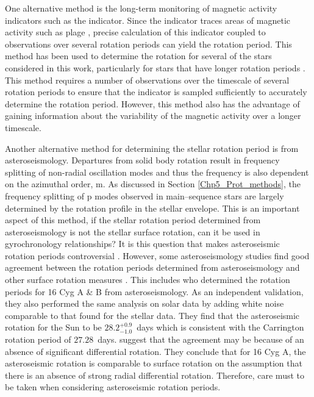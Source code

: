 One alternative method is the long-term monitoring of magnetic activity indicators such as the \Rprime indicator. Since the \Rprime indicator traces areas of magnetic activity such as plage \citep{Leighton_1959}, precise calculation of this indicator coupled to observations over several rotation periods can yield the rotation period. This method has been used to determine the rotation for several of the stars considered in this work, particularly for stars that have longer rotation periods \citep{Boro_Saikia_etal_2016,Vaughan_etal_1981,Robertson_etal_2015_GJ191}. This method requires a number of observations over the timescale of several rotation periods to ensure that the \Rprime indicator is sampled sufficiently to accurately determine the rotation period. However, this method also has the advantage of gaining information about the variability of the magnetic activity over a longer timescale.

Another alternative method for determining the stellar rotation period is from asteroseismology. Departures from solid body rotation result in frequency splitting of non-radial oscillation modes and thus the frequency is also dependent on the azimuthal order, m. As discussed in Section \ref{Chp5_Prot_methods}, the frequency splitting of p modes observed in main--sequence stars are largely determined by the rotation profile in the stellar envelope. This is an important aspect of this method, if the stellar rotation period determined from asteroseismology is not the stellar surface rotation, can it be used in gyrochronology relationships? It is this question that makes asteroseismic rotation periods controversial \citep{Barnes_etal_2016_aspect_gyro}. However, some asteroseismology studies find good agreement between the rotation periods determined from asteroseismology and other surface rotation measures \citep{Chaplin_etal_2013,Gizon_etal_2013}. This includes \citet{Davies_etal_2015} who determined the rotation periods for 16 Cyg A \& B from asteroseismology. As an independent validation, they also performed the same analysis on solar data by adding white noise comparable to that found for the stellar data. They find that the asteroseismic rotation for the Sun to be $28.2^{+0.9}_{-1.0}$~days which is consistent with the Carrington rotation period of $27.28$~days. \citet{Davies_etal_2015} suggest that the agreement may be because of an absence of significant differential rotation. They conclude that for 16 Cyg A, the asteroseismic rotation is comparable to surface rotation on the assumption that there is an absence of strong radial differential rotation. Therefore, care must to be taken when considering asteroseismic rotation periods.

